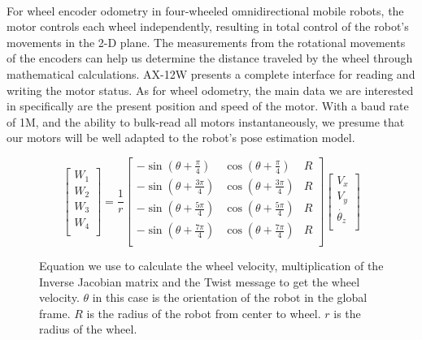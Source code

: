 \paragraph*{}
For wheel encoder odometry in four-wheeled omnidirectional mobile robots, the motor controls each wheel independently, resulting in total control of the robot's movements in the 2-D plane. The measurements from the rotational movements of the encoders can help us determine the distance traveled by the wheel through mathematical calculations.
AX-12W presents a complete interface for reading and writing the motor status. As for wheel odometry, the main data we are interested in specifically are the present position and speed of the motor. With a baud rate of 1M, and the ability to bulk-read all motors instantaneously, we presume that our motors will be well adapted to the robot's pose estimation model. \cite{phunopas2018motion}

\begin{figure} [H]
    \[
    \begin{bmatrix}
    W_1\\
    W_2\\
    W_3\\
    W_4\\
    \end{bmatrix}
    =
    \frac{1}{r}
    \begin{bmatrix}
    -\sin(\theta + \frac{\pi}{4})  & \cos(\theta +  \frac{\pi}{4})   & R \\
    -\sin(\theta + \frac{3\pi}{4}) & \cos(\theta +  \frac{3\pi}{4})  & R \\
    -\sin(\theta + \frac{5\pi}{4}) & \cos(\theta +  \frac{5\pi}{4})  & R \\
    -\sin(\theta + \frac{7\pi}{4}) & \cos(\theta +  \frac{7\pi}{4})  & R \\
    \end{bmatrix}
    \begin{bmatrix}
        V_x\\
        V_y\\
        \dot{\theta_z}\\
        \end{bmatrix}
    \]
    \caption{Equation we use to calculate the wheel velocity, multiplication of the Inverse Jacobian matrix and the Twist message to get the wheel velocity. $\theta$ in this case is the orientation of the robot in the global frame. $R$ is the radius of the robot from center to wheel. $r$ is the radius of the wheel.} 
    \label{fig:matrix-wheel}
\end{figure}



